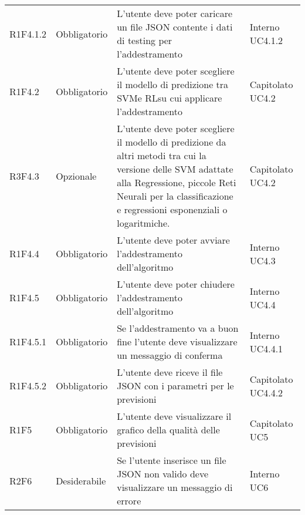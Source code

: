\begin{longtable} {
		>{}p{24mm} 
		>{}p{32mm}
		>{}p{40mm} 
		>{}p{24.5mm}
		}
		R1F4.1.2 & Obbligatorio & L'utente deve poter caricare un file JSON contente i dati di testing per l'addestramento & Interno UC4.1.2 \TBstrut \\ [2mm]		
		R1F4.2 & Obbligatorio & L'utente deve poter scegliere il modello di predizione tra SVM\glosp e RL\glosp su cui applicare l'addestramento & Capitolato UC4.2 \TBstrut \\ [2mm]
		R3F4.3 & Opzionale & L'utente deve poter scegliere il modello di predizione da altri metodi tra cui la versione delle SVM adattate alla Regressione, piccole Reti Neurali per la classificazione e regressioni esponenziali o logaritmiche. & Capitolato UC4.2 \TBstrut \\ [2mm]				
		R1F4.4 & Obbligatorio & L'utente deve poter avviare l'addestramento dell'algoritmo & Interno UC4.3 \TBstrut \\ [2mm]
		R1F4.5 & Obbligatorio & L'utente deve poter chiudere l'addestramento dell'algoritmo & Interno UC4.4 \TBstrut \\ [2mm]		
		R1F4.5.1 & Obbligatorio & Se l'addestramento va a buon fine l'utente deve visualizzare un messaggio di conferma & Interno UC4.4.1 \TBstrut \\ [2mm]		
		R1F4.5.2 & Obbligatorio & L'utente deve riceve il file JSON con i parametri per le previsioni & Capitolato UC4.4.2 \TBstrut \\ [2mm]
		R1F5 & Obbligatorio & L'utente deve visualizzare il grafico della qualità delle previsioni & Capitolato UC5 \TBstrut \\ [2mm]
		R2F6 & Desiderabile & Se l'utente inserisce un file JSON non valido deve visualizzare un messaggio di errore & Interno UC6 \TBstrut \\ [2mm]
		

\end{longtable}
